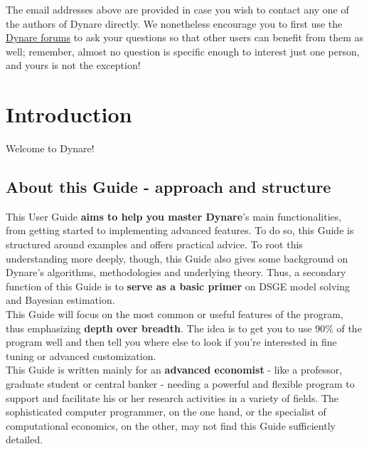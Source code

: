 \documentclass[cn,10pt,math=newtx,citestyle=gb7714-2015,bibstyle=gb7714-2015]{elegantbook}
\begin{document}
The email addresses above are provided in case you wish to contact any one of the authors of Dynare directly. We nonetheless encourage you to first use the \href{http://forum.dynare.org/}{Dynare forums} to ask your questions so that other users can benefit from them as well; remember, almost no question is specific enough to interest just one person, and yours is not the exception!
	
	\tableofcontents
	
	\mainmatter
	
	\chapter{Introduction}
	
	Welcome to Dynare! \\
	
	\section{About this Guide - approach and structure}
	This User Guide \textbf{aims to help you master Dynare}'s main functionalities, from getting started to implementing advanced features. To do so, this Guide is structured around examples and offers practical advice. To root this understanding more deeply, though, this Guide also gives some background on Dynare's algorithms, methodologies and underlying theory. Thus, a secondary function of this Guide is to \textbf{serve as a basic primer} on DSGE model solving and Bayesian estimation. \\
	
	This Guide will focus on the most common or useful features of the program, thus emphasizing \textbf{depth over breadth}. The idea is to get you to use 90\% of the program well and then tell you where else to look if you're interested in fine tuning or advanced customization.\\
	
	This Guide is written mainly for an \textbf{advanced economist} - like a professor, graduate student or central banker - needing a powerful and flexible program to support and facilitate his or her research activities in a variety of fields. The sophisticated computer programmer, on the one hand, or the specialist of computational economics, on the other, may not find this Guide sufficiently detailed. \\
	
\end{document}
